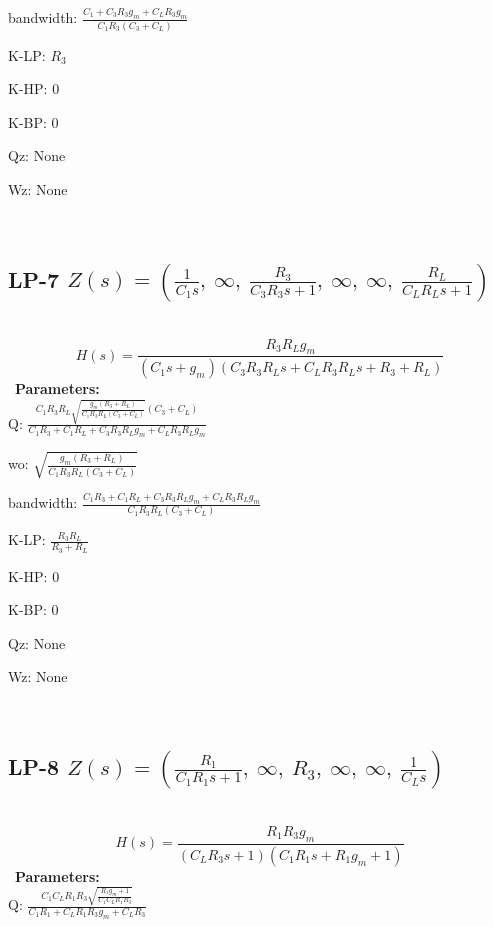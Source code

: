 \documentclass{article}
\begin{document}
bandwidth: $\frac{C_{1} + C_{3} R_{3} g_{m} + C_{L} R_{3} g_{m}}{C_{1} R_{3} \left(C_{3} + C_{L}\right)}$\ 

K-LP: $R_{3}$\ 

K-HP: $0$\ 

K-BP: $0$\ 

Qz: $\text{None}$\ 

Wz: $\text{None}$\ 

\ 

\subsection{LP-7 $Z(s) = \left( \frac{1}{C_{1} s}, \  \infty, \  \frac{R_{3}}{C_{3} R_{3} s + 1}, \  \infty, \  \infty, \  \frac{R_{L}}{C_{L} R_{L} s + 1}\right)$ } \ 
\textbf{\[H(s) = \frac{R_{3} R_{L} g_{m}}{\left(C_{1} s + g_{m}\right) \left(C_{3} R_{3} R_{L} s + C_{L} R_{3} R_{L} s + R_{3} + R_{L}\right)}\] } \ 
\textbf{Parameters:}\\ 

Q: $\frac{C_{1} R_{3} R_{L} \sqrt{\frac{g_{m} \left(R_{3} + R_{L}\right)}{C_{1} R_{3} R_{L} \left(C_{3} + C_{L}\right)}} \left(C_{3} + C_{L}\right)}{C_{1} R_{3} + C_{1} R_{L} + C_{3} R_{3} R_{L} g_{m} + C_{L} R_{3} R_{L} g_{m}}$\ 

wo: $\sqrt{\frac{g_{m} \left(R_{3} + R_{L}\right)}{C_{1} R_{3} R_{L} \left(C_{3} + C_{L}\right)}}$\ 

bandwidth: $\frac{C_{1} R_{3} + C_{1} R_{L} + C_{3} R_{3} R_{L} g_{m} + C_{L} R_{3} R_{L} g_{m}}{C_{1} R_{3} R_{L} \left(C_{3} + C_{L}\right)}$\ 

K-LP: $\frac{R_{3} R_{L}}{R_{3} + R_{L}}$\ 

K-HP: $0$\ 

K-BP: $0$\ 

Qz: $\text{None}$\ 

Wz: $\text{None}$\ 

\ 

\subsection{LP-8 $Z(s) = \left( \frac{R_{1}}{C_{1} R_{1} s + 1}, \  \infty, \  R_{3}, \  \infty, \  \infty, \  \frac{1}{C_{L} s}\right)$ } \ 
\textbf{\[H(s) = \frac{R_{1} R_{3} g_{m}}{\left(C_{L} R_{3} s + 1\right) \left(C_{1} R_{1} s + R_{1} g_{m} + 1\right)}\] } \ 
\textbf{Parameters:}\\ 

Q: $\frac{C_{1} C_{L} R_{1} R_{3} \sqrt{\frac{R_{1} g_{m} + 1}{C_{1} C_{L} R_{1} R_{3}}}}{C_{1} R_{1} + C_{L} R_{1} R_{3} g_{m} + C_{L} R_{3}}$\ 
\end{document}
